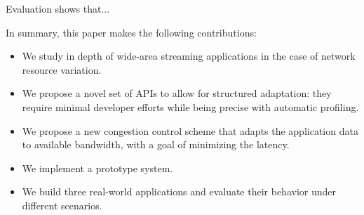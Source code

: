 Evaluation shows that...

In summary, this paper makes the following contributions:

\begin{itemize}[leftmargin=16pt]
\item We study in depth of wide-area streaming applications in the case of
  network resource variation.
\item We propose a novel set of APIs to allow for structured adaptation: they
  require minimal developer efforts while being precise with automatic
  profiling.
\item We propose a new congestion control scheme that adapts the application
  data to available bandwidth, with a goal of minimizing the latency.
\item We implement a prototype system.
\item We build three real-world applications and evaluate their behavior
  under different scenarios.
\end{itemize}

